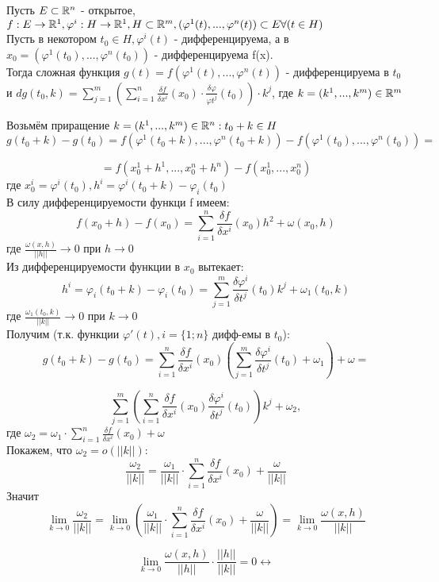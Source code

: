 \begin{teorema}
	Пусть $E\subset\mathbb{R}^n$ - открытое, $f:E\to\mathbb{R}^1, \varphi^i:H\to\mathbb{R}^1, H\subset\mathbb{R}^m, (\varphi^1(t),...,\varphi^n(t))\subset E \forall(t\in H)$
	\\
	Пусть в некотором $t_0\in H, \varphi^i(t)$ - дифференцируема, а в $x_0=(\varphi^1(t_0),...,\varphi^n(t_0))$ - дифференцируема f(x).
	\\
	Тогда сложная функция $g(t)=f(\varphi^1(t),...,\varphi^n(t))$ - дифференцируема в $t_0$ и $dg(t_0,k) = \sum_{j=1}^{m}(\sum_{i=1}^{n}\frac{\delta f}{\delta x^i}(x_0)\cdot \frac{\delta \varphi}{\varphi t^j}(t_0))\cdot k^j$, где $k=(k^1,...,k^m)\in\mathbb{R}^m$
\end{teorema}

\dokvo
Возьмём приращение $k=(k^1,...,k^m)\in\mathbb{R}^n:t_0+k\in H$
\\
$$
g(t_0+k) - g(t_0) = f(\varphi^1(t_0+k),...,\varphi^n(t_0+k)) - f(\varphi^1(t_0),...,\varphi^n(t_0))=
$$

$$
= f(x_0^1+h^1,...,x_0^n+h^n)-f(x_0^1,...,x_0^n)
$$
где $x_0^i = \varphi^i(t_0), h^i = \varphi^i(t_0+k)-\varphi_i(t_0)$
\\
В силу дифференцируемости функци f имеем:
$$
f(x_0+h)-f(x_0) = \sum_{i=1}^{n}\frac{\delta f}{\delta x^i}(x_0)h^2+\omega(x_0,h)
$$
где $\frac{\omega(x,h)}{||h||}\to 0$ при $h\to 0$
\\
Из дифференцируемости функции в $x_0$ вытекает:
$$
h^i = \varphi_i(t_0+k)-\varphi_i(t_0) = \sum_{j=1}^{m}\frac{\delta \varphi^i}{\delta t^j}(t_0)k^j+\omega_1(t_0,k)
$$
где $\frac{\omega_1(t_0,k)}{||k||}\to 0$ при $k\to 0$
\\
Получим (т.к. функции $\varphi'(t), i=\{1;n\}$ дифф-емы в $t_0$):
$$
g(t_0+k)-g(t_0) = \sum_{i=1}^{n}\frac{\delta f}{\delta x^i}(x_0)(\sum_{j=1}^{m}\frac{\delta\varphi^i}{\delta t^j}(t_0)+\omega_1)+\omega=
$$

$$
\sum_{j=1}^{m}(\sum_{i=1}^{n}\frac{\delta f}{\delta x^i}(x_0)\frac{\delta\varphi^i}{\delta t^j}(t_0))k^j+\omega_2,
$$
где $\omega_2 = \omega_1\cdot\sum_{i=1}^{n}\frac{\delta f}{\delta x^i}(x_0)+\omega$
\\
Покажем, что $\omega_2=o(||k||)$:
$$
\frac{\omega_2}{||k||}=\frac{\omega_1}{||k||}\cdot\sum_{i=1}^{n}\frac{\delta f}{\delta x^i}(x_0)+\frac{\omega}{||k||}
$$
Значит
$$
\lim_{k\to 0}\frac{\omega_2}{||k||} = \lim_{k\to 0}(\frac{\omega_1}{||k||}\cdot\sum_{i=1}^{n}\frac{\delta f}{\delta x^i}(x_0)+\frac{\omega}{||k||})=\lim_{k\to 0}\frac{\omega(x,h)}{||k||}
$$

$$
\lim_{k\to 0}\frac{\omega(x,h)}{||h||}\cdot\frac{||h||}{||k||} = 0 \leftrightarrow
$$

